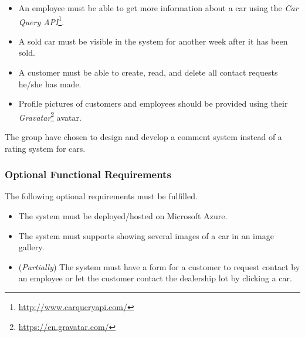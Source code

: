 \begin{itemize}
    \item An employee must be able to get more information about a car using the \textit{Car Query API}\footnote{\url{http://www.carqueryapi.com/}}.
    \item A sold car must be visible in the system for another week after it has been sold.
    \item A customer must be able to create, read, and delete all contact requests he/she has made.
    \item Profile pictures of customers and employees should be provided using their \textit{Gravatar}\footnote{\url{https://en.gravatar.com/}} avatar.
\end{itemize}
The group have chosen to design and develop a comment system instead of a rating system for cars.

\subsubsection{Optional Functional Requirements}
The following optional requirements must be fulfilled.
\begin{itemize}
	\item The system must be deployed/hosted on Microsoft Azure.
	\item The system must supports showing several images of a car in an image gallery.
	\item (\textit{Partially}) The system must have a form for a customer to request contact by an employee or let the customer contact the dealership lot by clicking a car.
\end{itemize}


